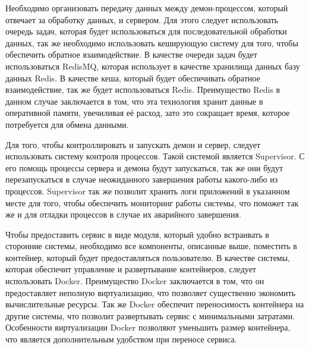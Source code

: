 Необходимо организовать передачу данных между демон-процессом, который отвечает за обработку данных, и сервером. Для этого следует использовать очередь задач, которая будет использоваться для последовательной обработки данных, так же необходимо использовать кеширующую систему для того, чтобы обеспечить обратное взаимодействие. В качестве очереди задач будет использоваться RedisMQ, которая использует в качестве хранилища данных базу данных Redis. В качестве кеша, который будет обеспечивать обратное взаимодействие, так же будет использоваться Redis. Преимущество Redis в данном случае заключается в том, что эта технология хранит данные в оперативной памяти, увечиливая её расход, зато это сокращает время, которое потребуется для обмена данными.

Для того, чтобы контроллировать и запускать демон и сервер, следует использовать систему контроля процессов. Такой системой является Supervisor. С его помощь процессы сервера и демона будут запускаться, так же они будут перезапускаться в случае неожиданного завершения работы какого-либо из процессов. Supervisor так же позволит хранить логи приложений в указанном месте для того, чтобы обеспечить мониторинг работы системы, что поможет так же и для отладки процессов в случае их аварийного завершения.

Чтобы предоставить сервис в виде модуля, который удобно встраивать в сторонние системы, необходимо все компоненты, описанные выше, поместить в контейнер, который будет предоставляться пользователю. В качестве системы, которая обеспечит управление и развертывание контейнеров, следует использовать Docker. Преимущество Docker заключается в том, что он предоставляет неполную виртуализацию, что позволяет существенно экономить вычислительные ресурсы. Так же Docker обеспечит переносимость контейнера на другие системы, что позволит развертывать сервис с минимальными затратами. Особенности виртуализации Docker позволяют уменьшить размер контейнера, что является дополнительным удобством при переносе сервиса.
